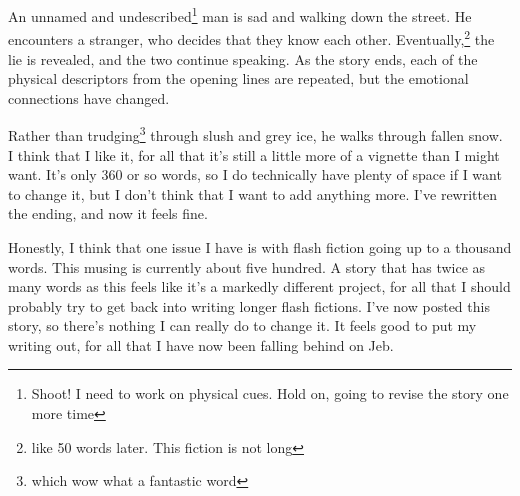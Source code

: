 \documentclass[12pt]{article}[titlepage]
\newcommand{\1}{\={a}}
\newcommand{\2}{\={e}}
\newcommand{\3}{\={\i}}
\newcommand{\4}{\=o}
\newcommand{\5}{\=u}
\newcommand{\6}{\={A}}
\renewcommand{\,}{\textsuperscript{,}}
\begin{document}
An unnamed and undescribed\footnote{Shoot! I need to work on physical cues. Hold on, going to revise the story one more time} man is sad and walking down the street.
He encounters a stranger, who decides that they know each other.
Eventually,\footnote{like 50 words later. This fiction is not long} the lie is revealed, and the two continue speaking.
As the story ends, each of the physical descriptors from the opening lines are repeated, but the emotional connections have changed.

Rather than trudging\footnote{which wow what a fantastic word} through slush and grey ice, he walks through fallen snow.
I think that I like it, for all that it's still a little more of a vignette than I might want.
It's only 360 or so words, so I do technically have plenty of space if I want to change it, but I don't think that I want to add anything more.
I've rewritten the ending, and now it feels fine.

Honestly, I think that one issue I have is with flash fiction going up to a thousand words.
This musing is currently about five hundred.
A story that has twice as many words as this feels like it's a markedly different project, for all that I should probably try to get back into writing longer flash fictions.
I've now posted this story, so there's nothing I can really do to change it.
It feels good to put my writing out, for all that I have now been falling behind on Jeb.
\end{document}
